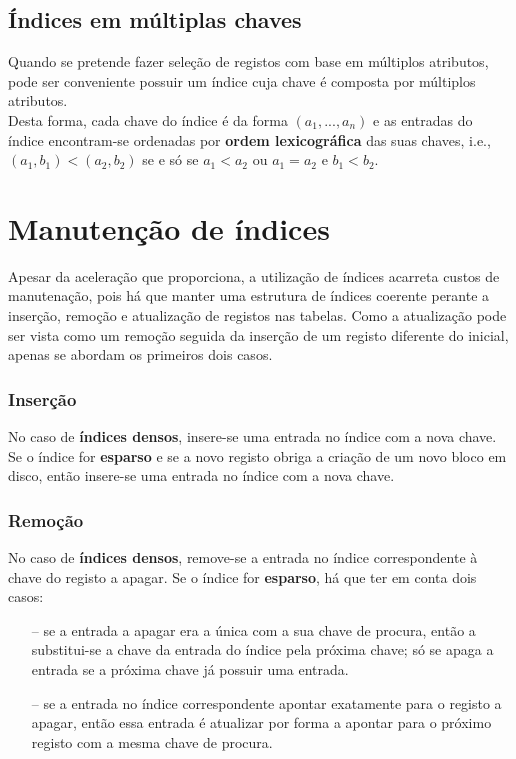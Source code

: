 \documentclass[oneside]{book}
\theoremstyle{definition}
\begin{document}
\subsection{Índices em múltiplas chaves}

Quando se pretende fazer seleção de registos com base em múltiplos atributos, pode ser conveniente possuir um índice cuja chave é composta por múltiplos atributos.\\
Desta forma, cada chave do índice é da forma $(a_1, ..., a_n)$ e as entradas do índice encontram-se ordenadas por \textbf{ordem lexicográfica} das suas chaves, i.e., $(a_1, b_1) < (a_2, b_2)$ se e só se $a_1 < a_2$ ou $a_1 = a_2$ e $b_1 < b_2$.

\section{Manutenção de índices}

Apesar da aceleração que proporciona, a utilização de índices acarreta custos de manutenação, pois há que manter uma estrutura de índices coerente perante a inserção, remoção e atualização de registos nas tabelas. Como a atualização pode ser vista como um remoção seguida da inserção de um registo diferente do inicial, apenas se abordam os primeiros dois casos.

\subsubsection{Inserção}

No caso de \textbf{índices densos}, insere-se uma entrada no índice com a nova chave.
Se o índice for \textbf{esparso} e se a novo registo obriga a criação de um novo bloco em disco, então insere-se uma entrada no índice com a nova chave.

\subsubsection{Remoção}

No caso de \textbf{índices densos}, remove-se a entrada no índice correspondente à chave do registo a apagar.
Se o índice for \textbf{esparso}, há que ter em conta dois casos:
\begin{itemize}
    \itemsep 0cm
    \item[--] se a entrada a apagar era a única com a sua chave de procura, então a substitui-se a chave da entrada do índice pela próxima chave; só se apaga a entrada se a próxima chave já possuir uma entrada.
    \item[--] se a entrada no índice correspondente apontar exatamente para o registo a apagar, então essa entrada é atualizar por forma a  apontar para o próximo registo com a mesma chave de procura.
\end{itemize}
\end{document}
